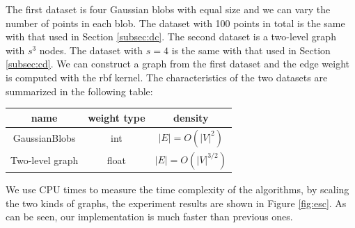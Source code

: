 The first dataset is four Gaussian blobs with equal size and we can vary the number of points in each blob. The dataset with 100 points in total is the same with that used in 
Section \ref{subsec:dc}. The second dataset is a two-level graph with $s^3$ nodes. The dataset with $s=4$ is the same with that used in Section \ref{subsec:cd}.
We can construct a graph from the first dataset and the edge weight is computed with the rbf kernel. The characteristics of the two datasets are summarized in the following table:
\begin{table}[!ht]
\centering
\begin{tabular}{ccc}
\hline
name & weight type & density \\
\hline
GaussianBlobs & int & $|E|=O(|V|^2)$\\
Two-level graph & float & $|E|=O(|V|^{3/2})$\\
\hline
\end{tabular}
\end{table}
We use CPU times to measure the time complexity of the algorithms, by scaling the two kinds of graphs, the experiment results are shown in Figure \ref{fig:esc}.
As can be seen, our implementation is much faster than previous ones.

